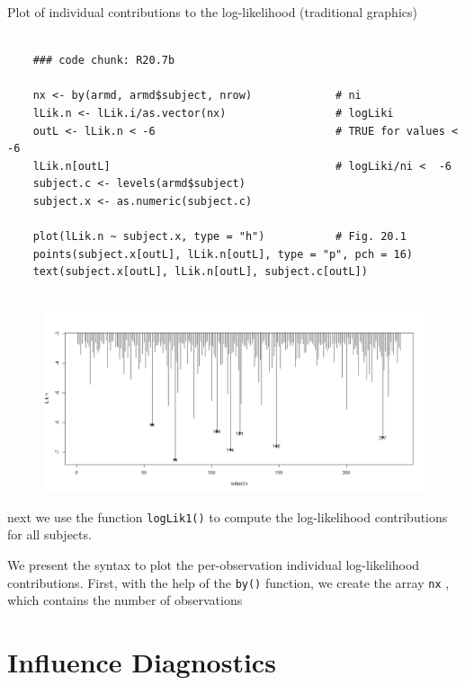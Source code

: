 \documentclass[a4paper,12pt]{article}
\begin{document}
Plot of individual contributions to the log-likelihood (traditional graphics)
\begin{framed}
\begin{verbatim}
	
	### code chunk: R20.7b

	nx <- by(armd, armd$subject, nrow)             # ni
	lLik.n <- lLik.i/as.vector(nx)                 # logLiki
	outL <- lLik.n < -6                            # TRUE for values < -6
	lLik.n[outL]                                   # logLiki/ni <  -6
	subject.c <- levels(armd$subject)
	subject.x <- as.numeric(subject.c)
	
	plot(lLik.n ~ subject.x, type = "h")           # Fig. 20.1
	points(subject.x[outL], lLik.n[outL], type = "p", pch = 16)
	text(subject.x[outL], lLik.n[outL], subject.c[outL])
	
\end{verbatim}
\end{framed}
\begin{figure}
\centering
\includegraphics[width=0.7\linewidth]{images/Chap20-image2}
\end{figure}


next we use the function \texttt{logLik1()} to compute the log-likelihood
contributions for all subjects.

\newpage




We present the syntax to plot the per-observation individual log-likelihood contributions.
First, with the help of the \texttt{by()} function, we create the array \texttt{nx} , which contains the number
of observations


\section{Influence Diagnostics}
\end{document}
